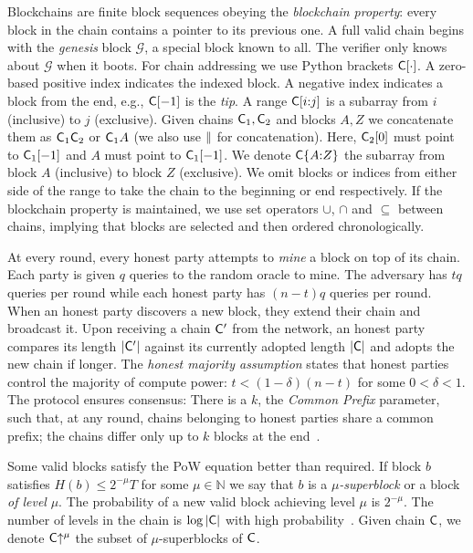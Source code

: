 Blockchains are finite block sequences obeying the \emph{blockchain property}:
every block in the chain contains a pointer to its previous one. A
full valid chain begins with the \emph{genesis} block $\mathcal{G}$,
a special block known to all. The verifier only knows about $\mathcal{G}$
when it boots. For chain addressing we use Python brackets $\mathsf{C}[\cdot]$. A
zero-based positive index indicates the indexed block.
A negative index indicates a block from the end, e.g., $\mathsf{C}[-1]$ is
the \emph{tip}. A range $\mathsf{C}[i{:}j]$ is a subarray from
$i$ (inclusive) to $j$ (exclusive). Given chains $\mathsf{C}_1, \mathsf{C}_2$ and blocks
$A, Z$ we concatenate them as $\mathsf{C}_1 \mathsf{C}_2$ or $\mathsf{C}_1 A$ (we also use $\mathbin{\|}$ for concatenation). Here,
$\mathsf{C}_2[0]$ must point to $\mathsf{C}_1[-1]$ and $A$ must point to $\mathsf{C}_1[-1]$.
We denote $\mathsf{C}\{A{:}Z\}$ the subarray from block $A$ (inclusive) to
block $Z$ (exclusive). We omit blocks or indices from either side of the range to
take the chain to the beginning or end respectively. If the blockchain
property is maintained, we use set operators $\cup$, $\cap$ and
$\subseteq$ between chains, implying that
blocks are selected and then ordered chronologically.

At every round, every honest party attempts to \emph{mine} a block on top of
its chain. Each party is given $q$ queries to the random
oracle to mine. The adversary
has $tq$ queries per round while each honest party has $(n - t)q$ queries per
round. When an honest party discovers a new block, they extend their chain
and broadcast it. Upon receiving a chain $\mathsf{C}'$ from the
network, an honest party compares its length $|\mathsf{C}'|$ against its currently
adopted length $|\mathsf{C}|$ and adopts the new chain if longer.
The \emph{honest majority assumption} states that
honest parties control the majority of compute power:
$t < (1 -  \delta)(n - t)$ for some $0 < \delta < 1$. The protocol
ensures consensus: There is a $k$, the
\emph{Common Prefix} parameter, such that, at any round, chains
belonging to honest parties share a common prefix; the chains
differ only up to $k$ blocks at the end~\cite{backbone}.

Some valid blocks satisfy the PoW equation better than required. If
block $b$ satisfies $H(b) \leq 2^{-\mu} T$ for some
$\mu \in \mathbb{N}$ we say that $b$ is a \emph{$\mu$-superblock} or a block
\emph{of level} $\mu$. The probability of a new valid block achieving level
$\mu$ is $2^{-\mu}$. The number of levels in the chain is $\log|\mathsf{C}|$
with high probability~\cite{popow}. Given chain $\mathsf{C}$, we denote
$\mathsf{C}\negthickspace\uparrow^\mu$ the subset of $\mu$-superblocks of $\mathsf{C}$.

